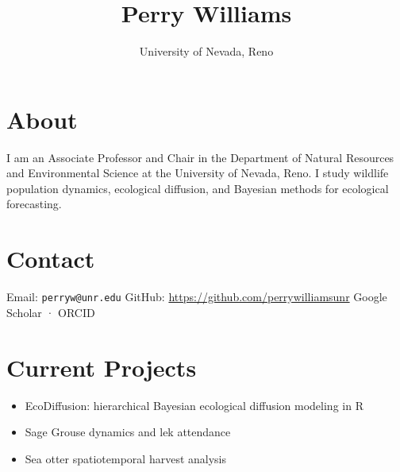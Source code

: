 \title{Perry Williams}
\author{University of Nevada, Reno}
\date{}

\maketitle

\section*{About}
I am an Associate Professor and Chair in the Department of Natural Resources and Environmental Science at the University of Nevada, Reno.  
I study wildlife population dynamics, ecological diffusion, and Bayesian methods for ecological forecasting.

\section*{Contact}
Email: \texttt{perryw@unr.edu}  
GitHub: \url{https://github.com/perrywilliamsunr}  
Google Scholar · ORCID

\section*{Current Projects}
\begin{itemize}
  \item EcoDiffusion: hierarchical Bayesian ecological diffusion modeling in R
  \item Sage Grouse dynamics and lek attendance
  \item Sea otter spatiotemporal harvest analysis
\end{itemize}
